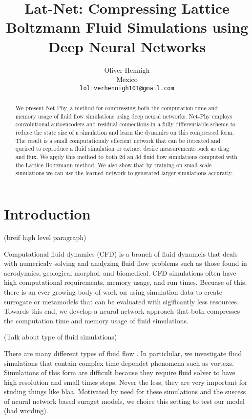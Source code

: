 \documentclass{article}
\title{Lat-Net: Compressing Lattice Boltzmann Fluid Simulations using Deep Neural Networks}
\author{
  Oliver Hennigh \\
  Mexico \\
  \texttt{loliverhennigh101@gmail.com} \\
}
\begin{document}

\maketitle

\begin{abstract}
We present Net-Phy, a method for compressing both the computation time and memory usage of fluid flow simulations using deep neural networks. Net-Phy employs convolutional autoencoders and residual connections in a fully differentiable scheme to reduce the state size of a simulation and learn the dynamics on this compressed form. The result is a small computationaly effecient network that can be itereated and queired to reproduce a fluid simulation or extract desire measurements such as drag and flux. We apply this method to both 2d an 3d fluid flow simulations computed with the Lattice Boltzmann method. We also show that by training on small scale simulations we can use the learned network to generated larger simulations accuratly.

\end{abstract}

\section{Introduction}

(breif high level paragraph)

Computational fluid dynamics (CFD) is a branch of fluid dynamcis that deals with numericaly solving and analyzing fluid flow problems such as those found in aerodynaics, geological morphol, and biomedical. CFD simulations often have high computational requirements, memory usage, and run times. Becuase of this, there is an ever growing body of work on using simulation data to create surrogate or metamodels that can be evaluated with sigificantly less resources. Towards this end, we develop a neural network approach that both compresses the computation time and memory usage of fluid simulations.

(Talk about type of fluid simulations)

There are many different types of fluid flow . In particlular, we investigate fluid simulations that contain complex time dependet phenomena such as vortexs. Simulations of this form are difficult because they require fluid solver to have high resolution and small times steps. Never the less, they are very important for studing things like blaa. Motivated by need for these simulations and the suscess of neural network based suraget models, we choice this setting to test our model (bad wording).
\end{document}
